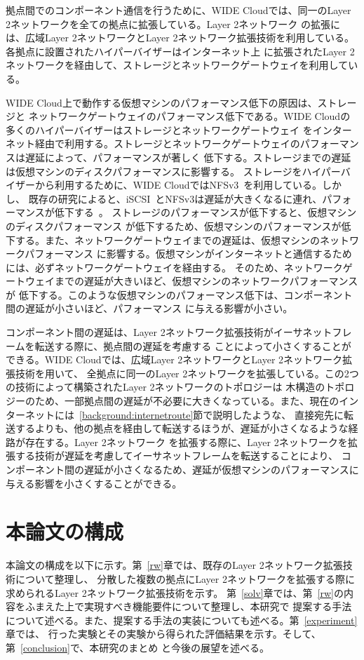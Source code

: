 拠点間でのコンポーネント通信を行うために、WIDE Cloudでは、同一のLayer 2ネットワークを全ての拠点に拡張している。Layer 2ネットワーク
の拡張には、広域Layer 2ネットワークとLayer 2ネットワーク拡張技術を利用している。各拠点に設置されたハイパーバイザーはインターネット上
に拡張されたLayer 2ネットワークを経由して、ストレージとネットワークゲートウェイを利用している。

WIDE Cloud上で動作する仮想マシンのパフォーマンス低下の原因は、ストレージと
ネットワークゲートウェイのパフォーマンス低下である。WIDE Cloudの多くのハイパーバイザーはストレージとネットワークゲートウェイ
をインターネット経由で利用する。ストレージとネットワークゲートウェイのパフォーマンスは遅延によって、パフォーマンスが著しく
低下する。ストレージまでの遅延は仮想マシンのディスクパフォーマンスに影響する。
ストレージをハイパーバイザーから利用するために、WIDE CloudではNFSv3~\cite{rfc:nfsv3}を利用している。しかし、
既存の研究によると、iSCSI~\cite{rfc:iscsi}とNFSv3は遅延が大きくなるに連れ、パフォーマンスが低下する~\cite{usenix:nfsperformance}。
ストレージのパフォーマンスが低下すると、仮想マシンのディスクパフォーマンス
が低下するため、仮想マシンのパフォーマンスが低下する。また、ネットワークゲートウェイまでの遅延は、仮想マシンのネットワークパフォーマンス
に影響する。仮想マシンがインターネットと通信するためには、必ずネットワークゲートウェイを経由する。
そのため、ネットワークゲートウェイまでの遅延が大きいほど、仮想マシンのネットワークパフォーマンスが
低下する。このような仮想マシンのパフォーマンス低下は、コンポーネント間の遅延が小さいほど、パフォーマンス
に与える影響が小さい。

コンポーネント間の遅延は、Layer 2ネットワーク拡張技術がイーサネットフレームを転送する際に、拠点間の遅延を考慮する
ことによって小さくすることができる。WIDE Cloudでは、広域Layer 2ネットワークとLayer 2ネットワーク拡張技術を用いて、
全拠点に同一のLayer 2ネットワークを拡張している。この2つの技術によって構築されたLayer 2ネットワークのトポロジーは
木構造のトポロジーのため、一部拠点間の遅延が不必要に大きくなっている。また、現在のインターネットには~\ref{background:internetroute}節で説明したような、
直接宛先に転送するよりも、他の拠点を経由して転送するほうが、遅延が小さくなるような経路が存在する。Layer 2ネットワーク
を拡張する際に、Layer 2ネットワークを拡張する技術が遅延を考慮してイーサネットフレームを転送することにより、
コンポーネント間の遅延が小さくなるため、遅延が仮想マシンのパフォーマンスに与える影響を小さくすることができる。

\section{本論文の構成}

本論文の構成を以下に示す。第~\ref{rw}章では、既存のLayer 2ネットワーク拡張技術について整理し、
分散した複数の拠点にLayer 2ネットワークを拡張する際に求められるLayer 2ネットワーク拡張技術を示す。
第~\ref{solv}章では、第~\ref{rw}の内容をふまえた上で実現すべき機能要件について整理し、本研究で
提案する手法について述べる。また、提案する手法の実装についても述べる。第~\ref{experiment}章では、
行った実験とその実験から得られた評価結果を示す。そして、第~\ref{conclusion}で、本研究のまとめ
と今後の展望を述べる。

